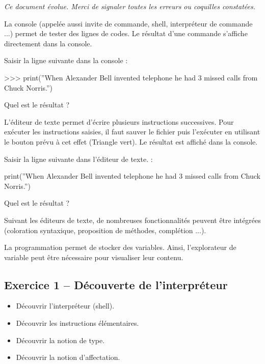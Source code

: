 \documentclass[10pt]{article}
\begin{document}
\textit{Ce document évolue. Merci de signaler toutes les erreurs ou coquilles constatées.}


La console (appelée aussi invite de commande, shell, interpréteur de commande ...) permet de tester des lignes de codes. Le résultat d'une commande s'affiche directement dans la console. 

\begin{exemple}
Saisir la ligne suivante dans la console :
\begin{py}
\begin{python}
>>> print(''When Alexander Bell invented telephone he had 3 missed calls from Chuck Norris.'')
\end{python}
\end{py}

Quel est le résultat ?
\end{exemple}

L'éditeur de texte permet d'écrire plusieurs instructions successives. Pour exécuter les instructions saisies, il faut sauver le fichier puis l'exécuter en utilisant le bouton prévu à cet effet (Triangle vert). Le résultat est affiché dans la console. 



\begin{exemple}
Saisir la ligne suivante dans l'éditeur de texte. :
\begin{py}
\begin{python}
print(''When Alexander Bell invented telephone he had 3 missed calls from Chuck Norris.'')
\end{python}
\end{py}

Quel est le résultat ?
\end{exemple}

Suivant les éditeurs de texte, de nombreuses fonctionnalités peuvent être intégrées (coloration syntaxique, proposition de méthodes, complétion ...).

La programmation permet de stocker des variables. Ainsi, l'explorateur de variable peut être nécessaire pour visualiser leur contenu.

\subsection*{Exercice 1 -- Découverte de l'interpréteur}
\begin{obj}
\begin{itemize}
\item Découvrir l'interpréteur (\textsf{shell}).
\item Découvrir les instructions élémentaires.
\item Découvrir la notion de type.
\item Découvrir la notion d'affectation. 
\end{itemize}
\end{obj}
\end{document}
